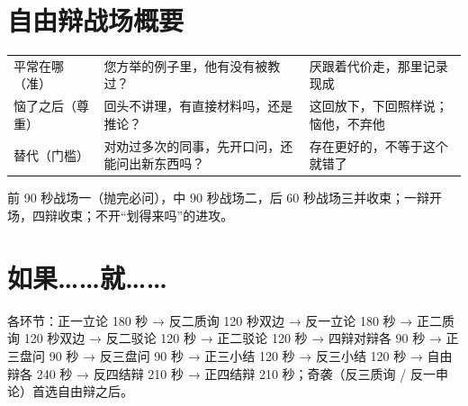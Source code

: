 \documentclass[quick,con]{debate}
\begin{document}
\section{自由辩战场概要}
\begin{tabularx}{\linewidth}{@{}L{7.2em}Y Y@{}}\toprule
{}&&\\\midrule
平常在哪（准）&您方举的例子里，他有没有被教过？&厌跟着代价走，那里记录现成\\
恼了之后（尊重）&回头不讲理，有直接材料吗，还是推论？&这回放下，下回照样说；恼他，不弃他\\
替代（门槛）&对劝过多次的同事，先开口问，还能问出新东西吗？&存在更好的，不等于这个就错了\\
\bottomrule\end{tabularx}
前 90 秒战场一（抛完必问），中 90 秒战场二，后 60 秒战场三并收束；一辩开场，四辩收束；不开“划得来吗”的进攻。

\section{如果……就……}
\begin{contingency}
\end{contingency}

各环节：正一立论 180 秒 → 反二质询 120 秒双边 → 反一立论 180 秒 → 正二质询 120 秒双边 → 反二驳论 120 秒 → 正二驳论 120 秒 → 四辩对辩各 90 秒 → 正三盘问 90 秒 → 反三盘问 90 秒 → 正三小结 120 秒 → 反三小结 120 秒 → 自由辩各 240 秒 → 反四结辩 210 秒 → 正四结辩 210 秒；奇袭（反三质询 / 反一申论）首选自由辩之后。
\end{document}
